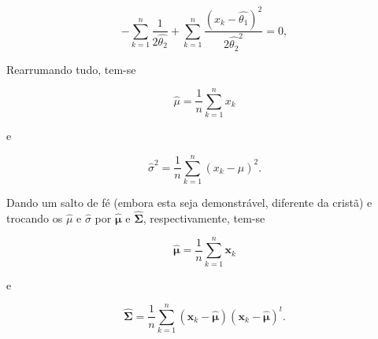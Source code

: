\begin{equation}
    -\sum_{k=1}^n \frac{1}{2\hat{\theta_2}} + \sum_{k=1}^n \frac{(x_k - \hat{\theta_1})^2}{2\hat{\theta_2}^2} = 0,
    \label{eq:grad_log_likelihood_mu_sigma_univar_theta_2}
\end{equation}

\noindent Rearrumando tudo, tem-se

\begin{equation}
    \hat{\mu} = \frac{1}{n} \sum_{k=1}^n x_k
    \label{eq:mu_optimum_case_2}
\end{equation}

\noindent e

\begin{equation}
    \hat{\sigma}^2 = \frac{1}{n} \sum_{k=1}^n (x_k - \hat{\mu})^2.
    \label{eq:sigma_optimum_case_2}
\end{equation}

Dando um salto de fé (embora esta seja demonstrável, diferente da cristã) e trocando os $\hat{\mu}$ e $\hat{\sigma}$ por $\boldsymbol{\hat{\mu}}$ e $\boldsymbol{\hat{\Sigma}}$, respectivamente, tem-se

\begin{equation}
    \boldsymbol{\hat{\mu}} = \frac{1}{n} \sum_{k=1}^n \boldsymbol{x}_k
    \label{eq:bold_mu_optimum_case_2}
\end{equation}

\noindent e

\begin{equation}
    \boldsymbol{\hat{\Sigma}} = \frac{1}{n} \sum_{k=1}^n (\boldsymbol{x}_k - \boldsymbol{\hat{\mu}})(\boldsymbol{x}_k - \boldsymbol{\hat{\mu}})^t.
    \label{eq:bold_sigma_optimum_case_2}
\end{equation}